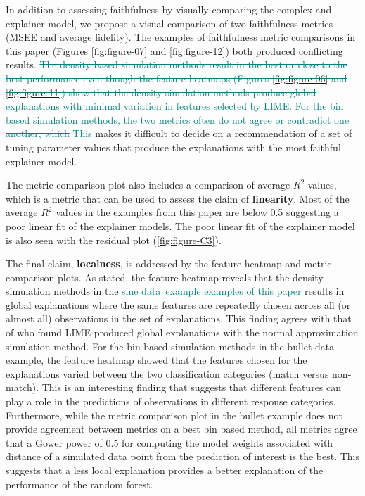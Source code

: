\documentclass[AMS,STIX2COL]{WileyNJD-v2}\usepackage[]{graphicx}\usepackage[]{color}
\newcommand{\kge}[1]{\textcolor{teal}{#1}}
\newcommand{\data}{sine data}
\begin{document}
In addition to assessing faithfulness by visually comparing the complex and explainer model, we propose a visual comparison of two faithfulness metrics (MSEE and average fidelity). The examples of faithfulness metric comparisons in this paper (Figures \ref{fig:figure-07} and \ref{fig:figure-12}) both produced conflicting results. \kge{\sout{The density based simulation methods result in the best or close to the best performance even though the feature heatmaps (Figures \ref{fig:figure-06} and \ref{fig:figure-11}) show that the density simulation methods produce global explanations with minimal variation in features selected by LIME. For the bin based simulation methods, the two metrics often do not agree or contradict one another, which} This} makes it difficult to decide on a recommendation of a set of tuning parameter values that produce the explanations with the most faithful explainer model.

The metric comparison plot also includes a comparison of average $R^2$ values, which is a metric that can be used to assess the claim of \textbf{linearity}. Most of the average $R^2$ values in the examples from this paper are below 0.5 suggesting a poor linear fit of the explainer models. The poor linear fit of the explainer model is also seen with the residual plot (\autoref{fig:figure-C3}).

The final claim, \textbf{localness}, is addressed by the feature heatmap and metric comparison plots. As stated, the feature heatmap reveals that the density simulation methods in the \kge{\data \ example \sout{examples of this paper}} results in global explanations where the same features are repeatedly chosen across all (or almost all) observations in the set of explanations. This finding agrees with that of \citet{laugel:2018} who found LIME produced global explanations with the normal approximation simulation method. For the bin based simulation methods in the bullet data example, the feature heatmap showed that the features chosen for the explanations varied between the two classification categories (match versus non-match). This is an interesting finding that suggests that different features can play a role in the predictions of observations in different response categories. Furthermore, while the metric comparison plot in the bullet example does not provide agreement between metrics on a best bin based method, all metrics agree that a Gower power of 0.5 for computing the model weights associated with distance of a simulated data point from the prediction of interest is the best. This suggests that a less local explanation provides a better explanation of the performance of the random forest.
\end{document}
